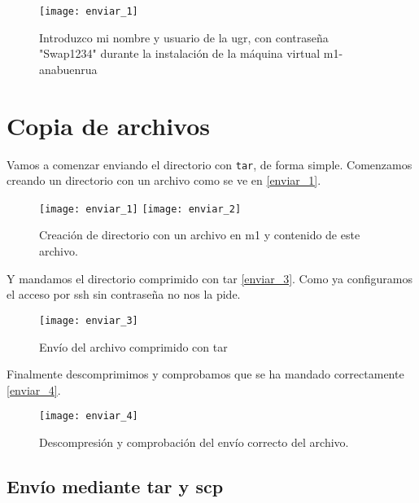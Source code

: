 
\begin{figure}
\begin{center}
\caption{Introduzco mi nombre y usuario de la ugr, con contraseña "Swap1234"  durante la instalación de la máquina virtual m1-anabuenrua}
\label{instalacion_nombre}
\texttt{[image: enviar\_1]}
\end{center}
\end{figure}


\chapter{Copia de archivos}

Vamos a comenzar enviando el directorio con \verb|tar|, de forma simple. Comenzamos creando un directorio con un archivo como se ve en \eqref{enviar_1}.

\begin{figure}
\begin{center}
\caption{Creación de directorio con un archivo en m1 y contenido de este archivo.}
\label{enviar_1}
\texttt{[image: enviar\_1]}
\texttt{[image: enviar\_2]}
\end{center}
\end{figure}

Y mandamos el directorio comprimido con tar \eqref{enviar_3}. Como ya configuramos el acceso por ssh sin contraseña no nos la pide.

\begin{figure}
\begin{center}
\caption{Envío del archivo comprimido con tar}
\label{enviar_3}
\texttt{[image: enviar\_3]}
\end{center}
\end{figure}

Finalmente descomprimimos y comprobamos que se ha mandado correctamente \eqref{enviar_4}.

\begin{figure}
\begin{center}
\caption{Descompresión y comprobación del envío correcto del archivo.}
\label{enviar_4}
\texttt{[image: enviar\_4]}
\end{center}
\end{figure}

\section{Envío mediante tar y scp}

